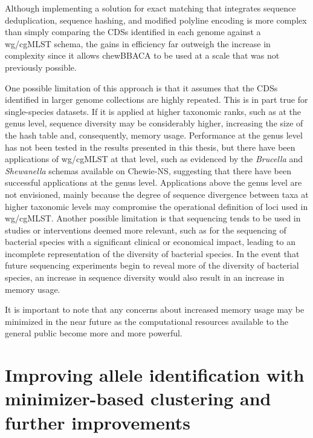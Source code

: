 Although implementing a solution for exact matching that integrates sequence deduplication, sequence hashing, and modified polyline encoding is more complex than simply comparing the CDSs identified in each genome against a \ac{wg/cgMLST} schema, the gains in efficiency far outweigh the increase in complexity since it allows chewBBACA to be used at a scale that was not previously possible.

One possible limitation of this approach is that it assumes that the CDSs identified in larger genome collections are highly repeated. This is in part true for single-species datasets. If it is applied at higher taxonomic ranks, such as at the genus level, sequence diversity may be considerably higher, increasing the size of the hash table and, consequently, memory usage. Performance at the genus level has not been tested in the results presented in this thesis, but there have been applications of wg/cgMLST at that level, such as evidenced by the \textit{Brucella} and \textit{Shewanella} schemas available on Chewie-NS, suggesting that there have been successful applications at the genus level. Applications above the genus level are not envisioned, mainly because the degree of sequence divergence between taxa at higher taxonomic levels may compromise the operational definition of loci used in wg/cgMLST. Another possible limitation is that sequencing tends to be used in studies or interventions deemed more relevant, such as for the sequencing of bacterial species with a significant clinical or economical impact, leading to an incomplete representation of the diversity of bacterial species. In the event that future sequencing experiments begin to reveal more of the diversity of bacterial species, an increase in sequence diversity would also result in an increase in memory usage.

It is important to note that any concerns about increased memory usage may be minimized in the near future as the computational resources available to the general public become more and more powerful.

\section{Improving allele identification with minimizer-based clustering and further improvements}

